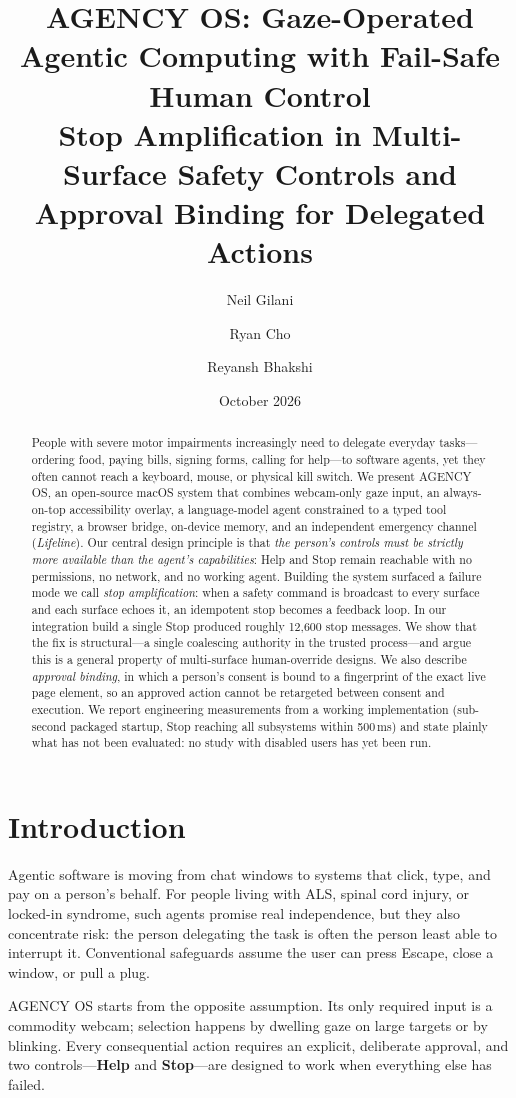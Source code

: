 \documentclass[11pt]{article}
\title{\textbf{AGENCY OS: Gaze-Operated Agentic Computing with Fail-Safe Human Control}\\[4pt]\large Stop Amplification in Multi-Surface Safety Controls and Approval Binding for Delegated Actions}
\author{Neil Gilani \and Ryan Cho \and Reyansh Bhakshi}
\date{October 2026}
\begin{document}
\maketitle
\begin{abstract}
People with severe motor impairments increasingly need to delegate everyday tasks---ordering food, paying bills, signing forms, calling for help---to software agents, yet they often cannot reach a keyboard, mouse, or physical kill switch. We present \textsc{AGENCY OS}, an open-source macOS system that combines webcam-only gaze input, an always-on-top accessibility overlay, a language-model agent constrained to a typed tool registry, a browser bridge, on-device memory, and an independent emergency channel (\emph{Lifeline}). Our central design principle is that \emph{the person's controls must be strictly more available than the agent's capabilities}: Help and Stop remain reachable with no permissions, no network, and no working agent. Building the system surfaced a failure mode we call \emph{stop amplification}: when a safety command is broadcast to every surface and each surface echoes it, an idempotent stop becomes a feedback loop. In our integration build a single Stop produced roughly 12{,}600 stop messages. We show that the fix is structural---a single coalescing authority in the trusted process---and argue this is a general property of multi-surface human-override designs. We also describe \emph{approval binding}, in which a person's consent is bound to a fingerprint of the exact live page element, so an approved action cannot be retargeted between consent and execution. We report engineering measurements from a working implementation (sub-second packaged startup, Stop reaching all subsystems within 500\,ms) and state plainly what has not been evaluated: no study with disabled users has yet been run.
\end{abstract}

\section{Introduction}
Agentic software is moving from chat windows to systems that click, type, and pay on a person's behalf. For people living with ALS, spinal cord injury, or locked-in syndrome, such agents promise real independence, but they also concentrate risk: the person delegating the task is often the person least able to interrupt it. Conventional safeguards assume the user can press Escape, close a window, or pull a plug.

\textsc{AGENCY OS} starts from the opposite assumption. Its only required input is a commodity webcam; selection happens by dwelling gaze on large targets or by blinking. Every consequential action requires an explicit, deliberate approval, and two controls---\textbf{Help} and \textbf{Stop}---are designed to work when everything else has failed.
\end{document}
